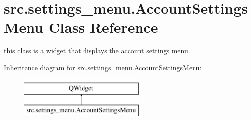 \hypertarget{classsrc_1_1settings__menu_1_1_account_settings_menu}{}\section{src.\+settings\+\_\+menu.\+Account\+Settings\+Menu Class Reference}
\label{classsrc_1_1settings__menu_1_1_account_settings_menu}


this class is a widget that displays the account settings menu.  


Inheritance diagram for src.\+settings\+\_\+menu.\+Account\+Settings\+Menu\+:\begin{figure}[H]
\begin{center}
\leavevmode
\includegraphics[height=2.000000cm]{classsrc_1_1settings__menu_1_1_account_settings_menu}
\end{center}
\end{figure}
